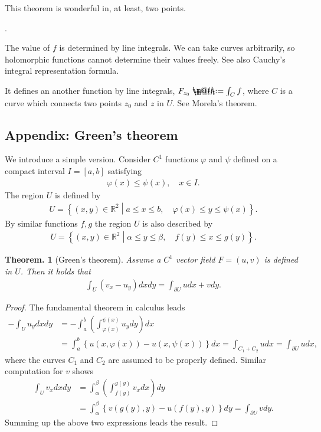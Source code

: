 \documentclass[openany, a4paper, oneside]{jsbook}
\makeatletter
\newcounter{enum2}
\renewenvironment{enumerate}{%
\begin{list}%
{%
\arabic{enum2}.\ \,%
}%
{%
\usecounter{enum2}
\setlength{\itemindent}{0pt}%
\setlength{\leftmargin}{15pt}%
\setlength{\rightmargin}{0pt}%
\setlength{\labelsep}{0pt}%
\setlength{\labelwidth}{6pt}%
\setlength{\itemsep}{0pt}%
\setlength{\parsep}{0pt}%
\setlength{\listparindent}{0pt}%
}
}{%
\end{list}%
}
\newcommand*{\defeq}{\mathrel{\rlap{%
\raisebox{0.3ex}{$\m@th\cdot$}}%
\raisebox{-0.3ex}{$\m@th\cdot$}}%
=}
\theoremstyle{break}
\theoremstyle{breakdefn}
\newtheorem{thm}{Theorem.}[section]
\newcommand{\rbk}[1]{\left (#1\right)}
\newcommand{\cbk}[1]{\left\{#1\right\}}
\newcommand{\relmiddle}[1]{\mathrel{}\middle#1\mathrel{}}
\newcommand{\set}[2]{\left\{#1 \relmiddle| #2\right\}}
\newcommand{\bbR}{\mathbb{R}}
\makeatother
\begin{document}
This theorem is wonderful in, at least, two points.
\begin{enumerate}
\item The value of $f$ is determined by line integrals.
   We can take curves arbitrarily, so holomorphic functions cannot determine their values freely.
   See also Cauchy's integral representation formula.
\item It defines an another function by line integrals, $F_{z_0} \defeq \int_{C} f$, where $C$ is a curve which connects two points $z_0$ and $z$ in $U$.
   See Morela's theorem.
\end{enumerate}
\subsection{Appendix: Green's theorem}


We introduce a simple version.
Consider $C^1$ functions $\varphi$ and $\psi$ defined on a compact interval $I=[a, b]$ satisfying
\begin{align}
 \varphi (x) \leq \psi (x), \quad x \in I.
\end{align}
The region $U$ is defined by
\begin{align}
 U
 =
 \set{(x,y) \in \bbR^2}{a \leq x \leq b, \quad \varphi (x) \leq y \leq \psi (x)}.
\end{align}
By similar functions $f, g$ the region $U$ is also described by
\begin{align}
 U
 =
 \set{(x,y) \in \bbR^2}{\alpha \leq y \leq \beta, \quad f (y) \leq x \leq g (y)}.
\end{align}
\begin{thm}[Green's theorem]
 Assume a $C^1$ vector field $F = (u, v)$ is defined in $U$.
 Then it holds that
 \begin{align}
  \int_U \rbk{v_x - u_y} dx dy
  =
  \int_{\partial U} udx + vdy.
 \end{align}
\end{thm}
\begin{proof}
The fundamental theorem in calculus leads
\begin{align}
 -\int_U u_y dx dy
 &=
 -\int_a^b \rbk{\int_{\varphi (x)}^{\psi (x)} u_y dy} dx \\
 &=
 \int_a^b \cbk{u (x, \varphi (x)) - u (x, \psi (x))} dx
 =
 \int_{C_1 + C_2} u dx
 =
 \int_{\partial U} u dx,
\end{align}
where the curves $C_1$ and $C_2$ are assumed to be properly defined.
Similar computation for $v$ shows
\begin{align}
 \int_U v_x dx dy
 &=
 \int_{\alpha}^{\beta} \rbk{\int_{f (y)}^{g (y)} v_x dx} dy \\
 &=
 \int_{\alpha}^{\beta} \cbk{v (g (y), y) - u (f (y), y)} dy
 =
 \int_{\partial U} v dy.
\end{align}
Summing up the above two expressions leads the result.
\end{proof}
\end{document}
